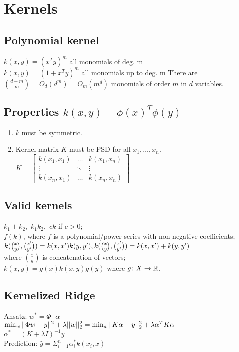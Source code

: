 \section*{Kernels}
\subsection*{Polynomial kernel}
$k(x,y) = (x^Ty)^m$  all monomials of deg. m \\
$k(x,y) = (1+x^Ty)^m$ all monomials up to deg. m
There are $\binom{d+m}{m}=O_d(d^m)=O_m(m^d)$ monomials of 
order $m$ in $d$ variables.

\subsection*{Properties $k(x,y) = \phi(x)^T\phi(y)$}
\begin{enumerate}[noitemsep,leftmargin=*,topsep=0pt,parsep=0pt,partopsep=0pt]
    \item $k$ must be symmetric.
    \item Kernel matrix $K$ must be PSD for all $x_1,\dots,x_n$.\\
$K=\begin{bmatrix}
    k(x_1,x_1)&\dots&k(x_1,x_n) \\ 
    \vdots&\ddots&\vdots\\
    k(x_n,x_1)&\dots&k(x_n,x_n)
    \end{bmatrix}
$\end{enumerate}

\subsection*{Valid kernels}
$k_1 + k_2,$
$k_1 k_2,$
$  c k$ if $c>0;$\\
$f(k)$, where $f$ is a polynomial/power series with non-negative coefficients;\\
$k(\binom{x}{y}, \binom{x'}{y'})=k(x,x')k(y,y'),\\ 
k(\binom{x}{y}, \binom{x'}{y'})=k(x,x') + k(y,y')$ \\
where $\binom{x}{y}$ is concatenation of vectors;\\
$k(x,y)=g(x)k(x,y)g(y)$ where $g\colon X\to\mathbb{R}$.


\subsection*{Kernelized Ridge}
Ansatz: $w^*=\Phi^\top\alpha$\\
$\min_w\|\Phi w-y\|^2 + \lambda ||w||_2^2\\
=\min_a ||K\alpha -y||_2^2 + \lambda \alpha^T K \alpha$\\
$\alpha^*=(K+\lambda I)^{-1} y$\\
Prediction: $\hat{y} = \Sigma_{i=1}^n \alpha_i^* k(x_i,x)$\\